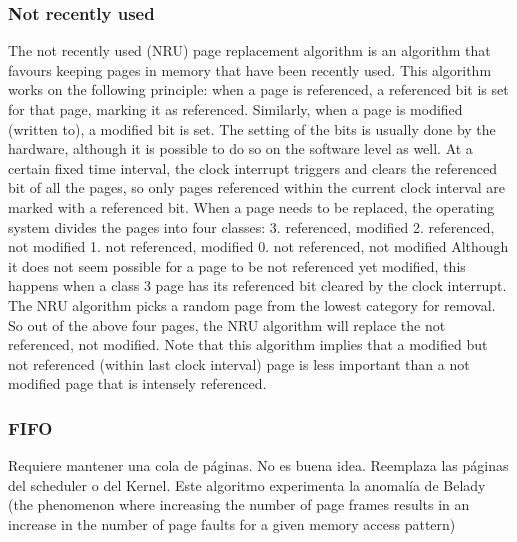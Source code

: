 \documentclass[a4paper, twoside]{article}
\begin{document}
\subsubsection{Not recently used}
The not recently used (NRU) page replacement algorithm is an algorithm that favours keeping pages in memory that have been recently used. This algorithm works on the following principle: when a page is referenced, a referenced bit is set for that page, marking it as referenced. Similarly, when a page is modified (written to), a modified bit is set. The setting of the bits is usually done by the hardware, although it is possible to do so on the software level as well.
At a certain fixed time interval, the clock interrupt triggers and clears the referenced bit of all the pages, so only pages referenced within the current clock interval are marked with a referenced bit. When a page needs to be replaced, the operating system divides the pages into four classes:
3. referenced, modified
2. referenced, not modified
1. not referenced, modified
0. not referenced, not modified
Although it does not seem possible for a page to be not referenced yet modified, this happens when a class 3 page has its referenced bit cleared by the clock interrupt. The NRU algorithm picks a random page from the lowest category for removal. So out of the above four pages, the NRU algorithm will replace the not referenced, not modified. Note that this algorithm implies that a modified but not referenced (within last clock interval) page is less important than a not modified page that is intensely referenced.

\subsubsection{FIFO}
Requiere mantener una cola de páginas.
No es buena idea.
Reemplaza las páginas del scheduler o del Kernel.
Este algoritmo experimenta la anomalía de Belady (the phenomenon where increasing the number of page frames results in an increase in the number of page faults for a given memory access pattern)
\end{document}
